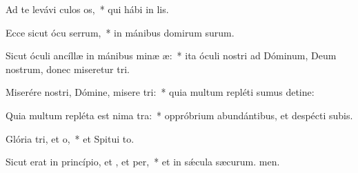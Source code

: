 \item Ad te levávi culos os,~* qui hábi in lis.
\item Ecce sicut ócu serrum,~* in mánibus domirum surum.
\item Sicut óculi ancíllæ in mánibus minæ æ:~* ita óculi nostri ad Dóminum, Deum nostrum, donec miseretur tri.
\item Miserére nostri, Dómine, misere tri:~* quia multum repléti sumus detine:
\item Quia multum repléta est nima tra:~* oppróbrium abundántibus, et despécti subis.
\item Glória tri, et o,~* et Spitui to.
\item Sicut erat in princípio, et , et per,~* et in sǽcula sæcurum. men.
